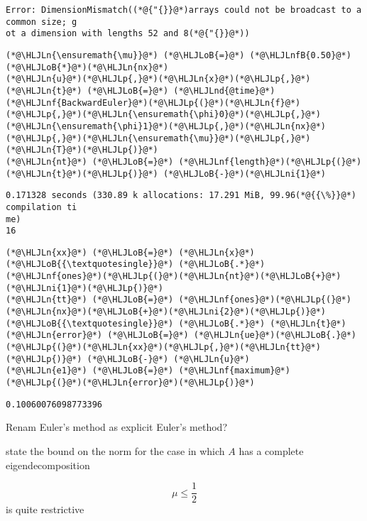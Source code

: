 \documentclass[12pt,a4paper]{article}
\newcommand{\HLJLn}[1]{#1}
\newcommand{\HLJLnd}[1]{\textcolor[RGB]{214,102,97}{#1}}
\newcommand{\HLJLnf}[1]{\textcolor[RGB]{66,102,213}{#1}}
\newcommand{\HLJLnfB}[1]{\textcolor[RGB]{59,151,46}{#1}}
\newcommand{\HLJLni}[1]{\textcolor[RGB]{59,151,46}{#1}}
\newcommand{\HLJLoB}[1]{\textcolor[RGB]{102,102,102}{\textbf{#1}}}
\newcommand{\HLJLp}[1]{#1}
\begin{document}
\begin{lstlisting}
Error: DimensionMismatch((*@{"{}}@*)arrays could not be broadcast to a common size; g
ot a dimension with lengths 52 and 8(*@{"{}}@*))
\end{lstlisting}


\begin{lstlisting}
(*@\HLJLn{\ensuremath{\mu}}@*) (*@\HLJLoB{=}@*) (*@\HLJLnfB{0.50}@*)(*@\HLJLoB{*}@*)(*@\HLJLn{nx}@*)
(*@\HLJLn{u}@*)(*@\HLJLp{,}@*)(*@\HLJLn{x}@*)(*@\HLJLp{,}@*)(*@\HLJLn{t}@*) (*@\HLJLoB{=}@*) (*@\HLJLnd{@time}@*) (*@\HLJLnf{BackwardEuler}@*)(*@\HLJLp{(}@*)(*@\HLJLn{f}@*)(*@\HLJLp{,}@*)(*@\HLJLn{\ensuremath{\phi}0}@*)(*@\HLJLp{,}@*)(*@\HLJLn{\ensuremath{\phi}1}@*)(*@\HLJLp{,}@*)(*@\HLJLn{nx}@*)(*@\HLJLp{,}@*)(*@\HLJLn{\ensuremath{\mu}}@*)(*@\HLJLp{,}@*)(*@\HLJLn{T}@*)(*@\HLJLp{)}@*)
(*@\HLJLn{nt}@*) (*@\HLJLoB{=}@*) (*@\HLJLnf{length}@*)(*@\HLJLp{(}@*)(*@\HLJLn{t}@*)(*@\HLJLp{)}@*) (*@\HLJLoB{-}@*)(*@\HLJLni{1}@*)
\end{lstlisting}

\begin{lstlisting}
0.171328 seconds (330.89 k allocations: 17.291 MiB, 99.96(*@{{\%}}@*) compilation ti
me)
16
\end{lstlisting}


\begin{lstlisting}
(*@\HLJLn{xx}@*) (*@\HLJLoB{=}@*) (*@\HLJLn{x}@*)(*@\HLJLoB{{\textquotesingle}}@*) (*@\HLJLoB{.*}@*) (*@\HLJLnf{ones}@*)(*@\HLJLp{(}@*)(*@\HLJLn{nt}@*)(*@\HLJLoB{+}@*)(*@\HLJLni{1}@*)(*@\HLJLp{)}@*)
(*@\HLJLn{tt}@*) (*@\HLJLoB{=}@*) (*@\HLJLnf{ones}@*)(*@\HLJLp{(}@*)(*@\HLJLn{nx}@*)(*@\HLJLoB{+}@*)(*@\HLJLni{2}@*)(*@\HLJLp{)}@*)(*@\HLJLoB{{\textquotesingle}}@*) (*@\HLJLoB{.*}@*) (*@\HLJLn{t}@*)
(*@\HLJLn{error}@*) (*@\HLJLoB{=}@*) (*@\HLJLn{ue}@*)(*@\HLJLoB{.}@*)(*@\HLJLp{(}@*)(*@\HLJLn{xx}@*)(*@\HLJLp{,}@*)(*@\HLJLn{tt}@*)(*@\HLJLp{)}@*) (*@\HLJLoB{-}@*) (*@\HLJLn{u}@*) 
(*@\HLJLn{e1}@*) (*@\HLJLoB{=}@*) (*@\HLJLnf{maximum}@*)(*@\HLJLp{(}@*)(*@\HLJLn{error}@*)(*@\HLJLp{)}@*)
\end{lstlisting}

\begin{lstlisting}
0.10060076098773396
\end{lstlisting}


Renam Euler's method as explicit Euler's method?

state the bound on the norm for the case in which $A$ has a complete eigendecomposition

\[
\mu \leq \frac{1}{2}
\]
is quite restrictive
\end{document}
